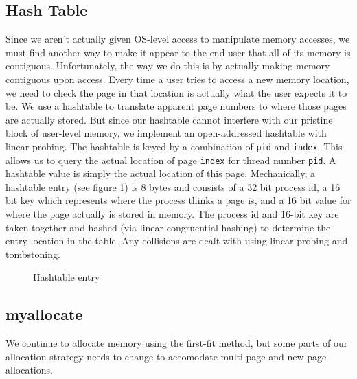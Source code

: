 \documentclass{article}
\begin{document}
\subsection{Hash Table}
Since we aren't actually given OS-level access to manipulate memory accesses, we must find another way to make it appear to the end user that all of its memory is contiguous. Unfortunately, the way we do this is by actually making memory contiguous upon access. Every time a user tries to access a new memory location, we need to check the page in that location is actually what the user expects it to be. We use a hashtable to translate apparent page numbers to where those pages are actually stored. But since our hashtable cannot interfere with our pristine block of user-level memory, we implement an open-addressed hashtable with linear probing. The hashtable is keyed by a combination of \verb|pid| and \verb|index|. This allows us to query the actual location of page \verb|index| for thread number \verb|pid|. A hashtable value is simply the actual location of this  page. Mechanically, a hashtable entry (see figure \ref{fig:hashtable_entry}) is 8 bytes and consists of a 32 bit process id, a 16 bit key which represents where the process thinks a page is, and a 16 bit value for where the page actually is stored in memory. The process id and 16-bit key are taken together and hashed (via linear congruential hashing) to determine the entry location in the table. Any collisions are dealt with using linear probing and tombstoning.
\begin{figure}
\centering
{}
\caption{Hashtable entry}
\label{fig:hashtable_entry}
\end{figure}

\subsection{myallocate}
We continue to allocate memory using the first-fit method, but some parts of our allocation strategy needs to change to accomodate multi-page and new page allocations.
\end{document}
